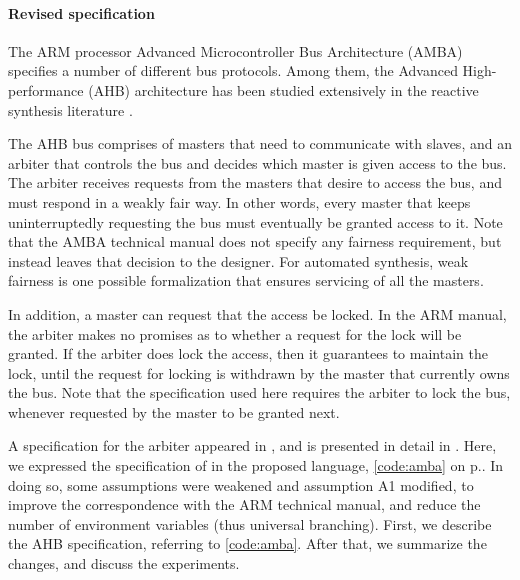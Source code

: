 \documentclass[copyright]{eptcs}
\begin{document}
\paragraph{Revised specification}

The ARM processor Advanced Microcontroller Bus Architecture (AMBA) \cite{ARM99rev2} specifies a number of different bus protocols.
Among them, the Advanced High-performance (AHB) architecture has been studied extensively in the reactive synthesis literature \cite{Bloem07date,Bloem07cocv,Morgenstern10phd,Bloem12jcss,Schlaipfer12,Godhal13sttt,Bloem14amba}.

The AHB bus comprises of masters that need to communicate with slaves, and an arbiter that controls the bus and decides which master is given access to the bus.
The arbiter receives requests from the masters that desire to access the bus, and must respond in a weakly fair way.
In other words, every master that keeps uninterruptedly requesting the bus must eventually be granted access to it.
Note that the AMBA technical manual \cite{ARM99rev2} does not specify any fairness requirement, but instead leaves that decision to the designer.
For automated synthesis, weak fairness is one possible formalization that ensures servicing of all the masters.

In addition, a master can request that the access be locked.
In the ARM manual, the arbiter makes no promises as to whether a request for the lock will be granted.
If the arbiter does lock the access, then it guarantees to maintain the lock, until the request for locking is withdrawn by the master that currently owns the bus.
Note that the specification used here requires the arbiter to lock the bus, whenever requested by the master to be granted next.

A specification for the arbiter appeared in \cite{Bloem07date}, and is presented in detail in \cite{Bloem12jcss}.
Here, we expressed the specification of \cite{Bloem12jcss} in the proposed language, \cref{code:amba} on p.\pageref{code:amba}.
In doing so, some assumptions were weakened and assumption A1 modified, to improve the correspondence with the ARM technical manual, and reduce the number of environment variables (thus universal branching).
First, we describe the AHB specification, referring to \cref{code:amba}.
After that, we summarize the changes, and discuss the experiments.
\end{document}
